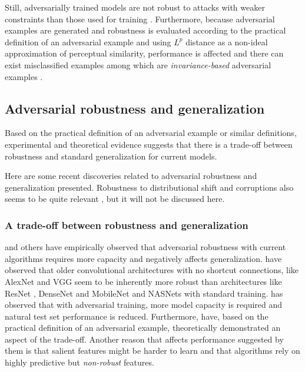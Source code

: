 \documentclass{article}
\begin{document}
Still, adversarially trained models are not robust to attacks with weaker constraints than those used for training \citep{Schott:2018:TDFARNNMM}. Furthermore, because adversarial examples are generated and robustness is evaluated according to the practical definition of an adversarial example and using $L^p$ distance as a non-ideal approximation of perceptual similarity, performance is affected \citep{Madry:2017:TDLMRAA,Tsipras:2018:RMBOA} and there can exist misclassified examples among which are \textit{invariance-based} adversarial examples \citep{Jacobsen:2019:EEICNBAR}.



\subsection{Adversarial robustness and generalization} \label{sec:robustness-generalization}

Based on the practical definition of an adversarial example or similar definitions, experimental \citep{Madry:2017:TDLMRAA,Su:2018:IRTCOACSRDICM} and theoretical evidence \citep{Tsipras:2018:RMBOA} suggests that there is a trade-off between robustness and standard generalization for current models.

Here are some recent discoveries related to adversarial robustness and generalization presented. Robustness to distributional shift and corruptions also seems to be quite relevant \citep{Gilmer:2019:AENCTEN,Hendrycks:2019:BNNRCCP}, but it will not be discussed here.

\subsubsection{A trade-off between robustness and generalization}

\cite{Madry:2017:TDLMRAA,Su:2017:OPAFDNN,Tsipras:2018:RMBOA} and others have empirically observed that adversarial robustness with current algorithms requires more capacity and negatively affects generalization. \cite{Su:2017:OPAFDNN} have observed that older convolutional architectures with no shortcut connections, like AlexNet \citep{Krizhevsky:2012:ICDCNN} and VGG \citep{Simonyan:2014:VDCNLSIR} seem to be inherently more robust than architectures like ResNet \citep{He:2015:DRLIR}, DenseNet \citep{Huang:2016:DCCN} and MobileNet \citep{Howard:2017:MECNNMVA} and NASNets \citep{Zoph:2018:LTASIR} with standard training. \citet{Madry:2017:TDLMRAA} has observed that with adversarial training, more model capacity is required and natural test set performance is reduced. Furthermore, \citet{Tsipras:2018:RMBOA} have, based on the practical definition of an adversarial example, theoretically demonstrated an aspect of the trade-off. Another reason that affects performance suggested by them is that salient features might be harder to learn and that algorithms rely on highly predictive but \textit{non-robust} features.
\end{document}
